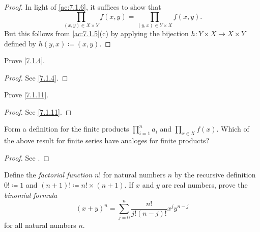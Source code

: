 \begin{proof}
  In light of \cref{ac:7.1.6}, it suffices to show that
  \[
    \prod_{(x, y) \in X \times Y} f(x, y) = \prod_{(y, x) \in Y \times X} f(x, y).
  \]
  But this follows from \cref{ac:7.1.5}(c) by applying the bijection \(h : Y \times X \to X \times Y\) defined by \(h(y, x) \coloneqq (x, y)\).
\end{proof}

\exercisesection

\begin{ex}\label{ex:7.1.1}
  Prove \cref{7.1.4}.
\end{ex}

\begin{proof}
  See \cref{7.1.4}.
\end{proof}

\begin{ex}\label{ex:7.1.2}
  Prove \cref{7.1.11}.
\end{ex}

\begin{proof}
  See \cref{7.1.11}.
\end{proof}

\begin{ex}\label{ex:7.1.3}
  Form a definition for the finite products \(\prod_{i = 1}^n a_i\) and \(\prod_{x \in X} f(x)\).
  Which of the above result for finite series have analoges for finite products?
\end{ex}

\begin{proof}
  See .
\end{proof}

\begin{ex}\label{ex:7.1.4}
  Define the \emph{factorial function} \(n!\) for natural numbers \(n\) by the recursive definition \(0! \coloneqq 1\) and \((n + 1)! \coloneqq n! \times (n + 1)\).
  If \(x\) and \(y\) are real numbers, prove the \emph{binomial formula}
  \[
    (x + y)^n = \sum_{j = 0}^n \frac{n!}{j!(n - j)!} x^j y^{n - j}
  \]
  for all natural numbers \(n\).
\end{ex}

